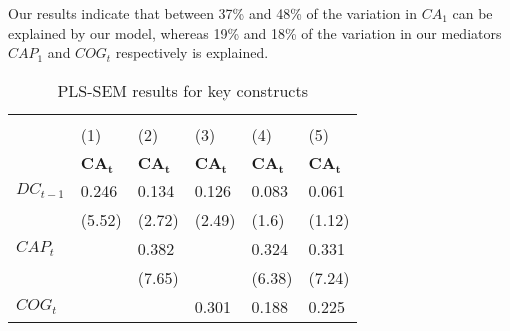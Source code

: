 \documentclass[review,fleqn]{elsarticle}\usepackage[]{graphicx}\usepackage[]{color}
\begin{document}
Our results indicate that between 37\% and 48\% of the variation in $CA_1$ can be
explained by our model, whereas 19\% and 18\% of the variation in our mediators $CAP_1$
and $COG_t$ respectively is explained.


\begin{table}[t]
  \caption{PLS-SEM results for key constructs}
\label{tab:res}
  \scriptsize






\begin{tabular}{l*{5}{l}}

  \hline                                                                                                                                                                                \\[-0.5em]
                           & (1)                        & (2)                           & (3)                           & (4)                        & (5)                              \\ 
  \hline                                                                                                                                                                                \\
  \rowcolor{Gray}
                           & $\mathbf{CA_t}$            & $\mathbf{CA_t}$               & $\mathbf{CA_t}$               & $\mathbf{CA_t}$            & $\mathbf{CA_t}$                  \\     
  $DC_{t-1}$               & 0.246             & 0.134                & 0.126                & 0.083             & 0.061                  \\
                           & (5.52)  & (2.72)     & (2.49)     & (1.6)  & (1.12)       \\ [1em]
  $CAP_{t}$                &                            & 0.382                &                               & 0.324             & 0.331                  \\
                           &                            & (7.65)     &                               & (6.38)  & (7.24)       \\[1em]
  $COG_{t}$                &                            &                               & 0.301                & 0.188             & 0.225                  \\

\end{tabular}
\end{table}
\end{document}
